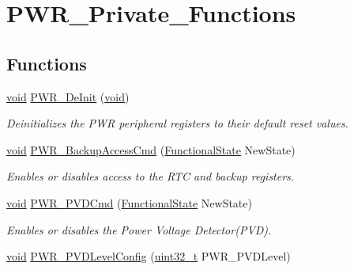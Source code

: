 \hypertarget{group___p_w_r___private___functions}{}\section{P\+W\+R\+\_\+\+Private\+\_\+\+Functions}
\label{group___p_w_r___private___functions}
\subsection*{Functions}
\begin{DoxyCompactItemize}
\item 
\hyperlink{usb__devapi_8h_afabf60e7f57651d6d595a02c75f07cd0}{void} \hyperlink{group___p_w_r___private___functions_gad03a0aac7bc3bc3a9fd012f3769a6990}{P\+W\+R\+\_\+\+De\+Init} (\hyperlink{usb__devapi_8h_afabf60e7f57651d6d595a02c75f07cd0}{void})
\begin{DoxyCompactList}\small\item\em Deinitializes the P\+WR peripheral registers to their default reset values. \end{DoxyCompactList}\item 
\hyperlink{usb__devapi_8h_afabf60e7f57651d6d595a02c75f07cd0}{void} \hyperlink{group___p_w_r___private___functions_ga0741aea35572b1a75f82b74de12df800}{P\+W\+R\+\_\+\+Backup\+Access\+Cmd} (\hyperlink{agilefox_2library_2inc_2stm32f10x__type_8h_ac9a7e9a35d2513ec15c3b537aaa4fba1}{Functional\+State} New\+State)
\begin{DoxyCompactList}\small\item\em Enables or disables access to the R\+TC and backup registers. \end{DoxyCompactList}\item 
\hyperlink{usb__devapi_8h_afabf60e7f57651d6d595a02c75f07cd0}{void} \hyperlink{group___p_w_r___private___functions_ga42cad476b816e0a33594a933b3ed1acd}{P\+W\+R\+\_\+\+P\+V\+D\+Cmd} (\hyperlink{agilefox_2library_2inc_2stm32f10x__type_8h_ac9a7e9a35d2513ec15c3b537aaa4fba1}{Functional\+State} New\+State)
\begin{DoxyCompactList}\small\item\em Enables or disables the Power Voltage Detector(\+P\+V\+D). \end{DoxyCompactList}\item 
\hyperlink{usb__devapi_8h_afabf60e7f57651d6d595a02c75f07cd0}{void} \hyperlink{group___p_w_r___private___functions_ga237c143ef6aa55abb8049fa7bf24ab8f}{P\+W\+R\+\_\+\+P\+V\+D\+Level\+Config} (\hyperlink{_p_e___types_8h_a33594304e786b158f3fb30289278f5af}{uint32\+\_\+t} P\+W\+R\+\_\+\+P\+V\+D\+Level)

\end{DoxyCompactItemize}
